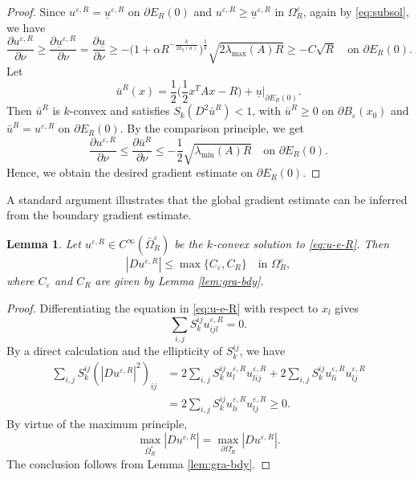 \documentclass[reqno]{amsart}
\newtheorem{lemma}[theorem]{Lemma}
\theoremstyle{remark}
\theoremstyle{definition}
\numberwithin{equation}{section}
\begin{document}
\begin{proof}
	Since $u^{\varepsilon,R}=\underline{u}^{\varepsilon,R}$ on $\partial E_R(0)$ and $u^{\varepsilon,R}\geq\underline{u}^{\varepsilon,R}$ in $\Omega_R^\varepsilon$, again by \eqref{eq:subsol}, we have
	\[
        \frac{\partial u^{\varepsilon,R}}{\partial \nu} \geq \frac{\partial \underline{u}^{\varepsilon,R}}{\partial \nu}=\frac{\partial \underline{u}}{\partial \nu}\geq-\bigg(1+\alpha R^{-\frac{k}{2h_k(a)}}\bigg)^{\frac{1}{k}}\sqrt{2\lambda_{\text{max}}(A)R}\geq-C\sqrt{R}   \quad \text{on } \partial E_R(0).
    \]
	Let 
	\[\bar{u}^R(x)=\frac{1}{2}\bigg(\frac{1}{2}x^TAx-R\bigg)+ \underline{u}|_{\partial E_R(0)}.\] 
	Then $\bar{u}^R$ is $k$-convex and satisfies $S_k(D^2\bar{u}^R)<1$, with $\bar{u}^R\geq0$ on $\partial B_\varepsilon(x_0)$ and $\bar{u}^R=u^{\varepsilon,R}$ on $\partial E_R(0)$. By the comparison principle, we get
	\[ 
	\frac{\partial u^{\varepsilon,R}}{\partial \nu}\leq\frac{\partial\bar{u}^R}{\partial\nu}\leq-\frac{1}{2}\sqrt{\lambda_{\text{min}}(A)R} \quad \text{on } \partial E_R (0).
	\]
	Hence, we obtain the desired   gradient estimate on $\partial E_R(0)$.
\end{proof}

A standard argument illustrates that the global gradient estimate can be inferred from the boundary gradient estimate.

\begin{lemma}\label{lem:C1_est}
    Let $u^{\varepsilon,R} \in C^\infty(\bar{\Omega}_R^\varepsilon)$ be the $k$-convex solution to \eqref{eq:u-e-R}. Then
	$$|Du^{\varepsilon,R}|\leq\max\{ C_\varepsilon, C_R\}\quad\text{in }\Omega_R^\varepsilon,$$
	where $C_\varepsilon$ and $C_R$ are given by Lemma \ref{lem:gra-bdy}.
\end{lemma}
\begin{proof}
	Differentiating the equation in \eqref{eq:u-e-R} with respect to $x_l$ gives
	$$\sum_{i,j}S_k^{ij} u^{\varepsilon,R}_{ijl} = 0.$$
	By a direct calculation and the ellipticity of $S_k^{ij}$, we have
	\begin{equation*}
		\begin{split}
			\sum_{i,j}S_k^{ij} (|Du^{\varepsilon,R}|^2)_{ij} & = 2\sum_{i,j}S_k^{ij} u^{\varepsilon,R}_l u^{\varepsilon,R}_{lij} + 2\sum_{i,j}S_k^{ij} u^{\varepsilon,R}_{li} u^{\varepsilon,R}_{lj} \\
			& = 2\sum_{i,j}S_k^{ij} u^{\varepsilon,R}_{li} u^{\varepsilon,R}_{lj} \geq 0.
		\end{split}
	\end{equation*}
	By virtue of the maximum principle, 
    \begin{equation}\label{eq:mp}
        \max_{\bar{\Omega}_R^\varepsilon} |D u^{\varepsilon,R}| = \max_{\partial\Omega_R^\varepsilon} |D u^{\varepsilon,R}|.
    \end{equation}
	The conclusion follows from Lemma \ref{lem:gra-bdy}.
\end{proof}
 
\end{document}
